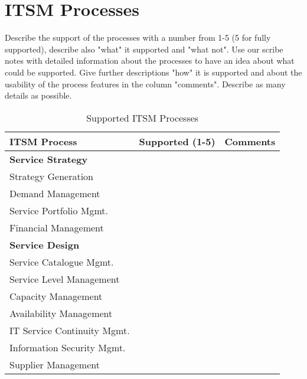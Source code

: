\section{ITSM Processes}
\label{sec:itsmprocesses}

Describe the support of the processes with a number from 1-5 (5 for fully supported), describe also "what" it supported and "what not". Use our scribe notes with detailed information about the processes to have an idea about what could be supported. Give further descriptions "how" it is supported and about the usability of the process features in the column "comments". Describe as many details as possible.

\begin{table}[h!]
\caption{Supported ITSM Processes}
\vspace*{0.3cm}
\begin{tabular}{|p{6.1cm}|p{4.5cm}|p{4.5cm}|}\hline
\textbf{ITSM Process}             &\textbf{Supported (1-5)}        &\textbf{Comments}\\\hline\hline
\textbf{Service Strategy}          &                                &\\
Strategy Generation            &                                &\\
Demand Management                   &                                &\\
Service Portfolio Mgmt.                   &                                &\\
Financial Management                   &                                &\\\hline
\textbf{Service Design}          &                                &\\
Service Catalogue Mgmt.                   &                                &\\
Service Level Management                   &                                &\\
Capacity Management                   &                                &\\
Availability Management                   &                                &\\
IT Service Continuity Mgmt.                   &                                &\\
Information Security Mgmt.                   &                                &\\
Supplier Management                   &                                &\\\hline

\end{tabular}
\end{table}
